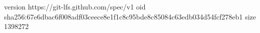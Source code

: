 version https://git-lfs.github.com/spec/v1
oid sha256:67e6dbac6f008adf03ceece8e1f1c8c95bde8c85084c63edb034d54fcf278eb1
size 1398272
